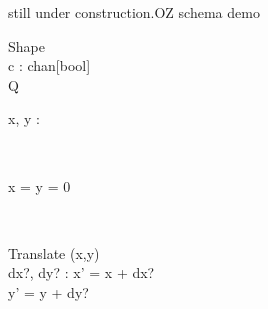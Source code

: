still under construction.OZ schema demo
\begin{class}{Shape}
\\c : chan[bool]
\\Q{}
\\
\begin{state}
x, y : \real
\end{state} 
\\
\begin{init}
x = y = 0
\end{init} 
\\
\begin{op}{Translate}
\Delta (x,y)
\\
dx?, dy? : \real
\ST
x’ = x + dx?
\\y’ = y + dy?
\end{op}\end{class}
\newpage %
